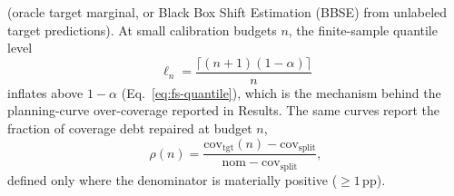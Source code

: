 \documentclass[preprint,11pt,authoryear]{elsarticle}
\begin{document}
(oracle target marginal, or Black Box Shift Estimation (BBSE) from unlabeled target predictions).
At small calibration budgets
$n$, the finite-sample quantile level
\begin{equation}
\label{eq:fs-quantile}
\ell_n
=\frac{\lceil(n{+}1)(1{-}\alpha)\rceil}{n}
\end{equation}
inflates above $1{-}\alpha$ (Eq.~\eqref{eq:fs-quantile}), which is the mechanism behind the planning-curve over-coverage reported in
Results. The same curves report the fraction of coverage debt repaired at budget $n$,
\begin{equation}
\label{eq:debt-repaired}
\rho(n)
=\frac{\mathrm{cov}_{\mathrm{tgt}}(n)-\mathrm{cov}_{\mathrm{split}}}{\mathrm{nom}-\mathrm{cov}_{\mathrm{split}}},
\end{equation}
defined only where the denominator is materially positive (${\ge}1$\,pp).
\end{document}
